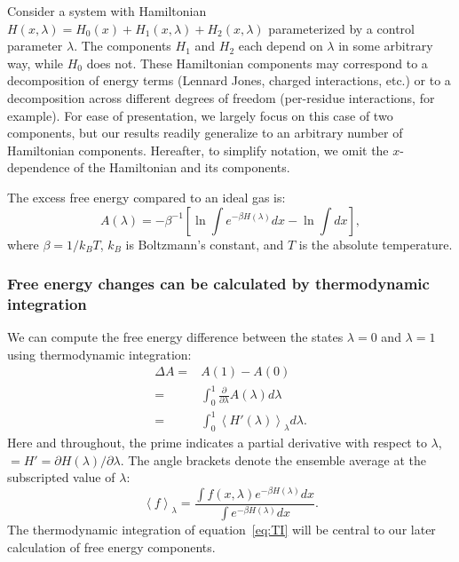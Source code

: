 \documentclass{article}
\begin{document}
Consider a system with Hamiltonian $H(x, \lambda) = H_0 (x) + H_1(x, \lambda) + H_2(x, \lambda)$ parameterized by a control parameter $\lambda$. The components $H_1$ and  $H_2$ each depend on $\lambda$ in some arbitrary way, while $H_0$ does not.  These Hamiltonian components may correspond to a decomposition of energy terms (Lennard Jones, charged interactions, etc.) or to a decomposition across different degrees of freedom (per-residue interactions, for example). For ease of presentation, we largely focus on this case of two components, but our results readily generalize to an arbitrary number of Hamiltonian components. Hereafter, to simplify notation, we omit the $x$-dependence of the Hamiltonian and its components.

The excess free energy compared to an ideal gas is:
\begin{equation}\label{eq:dA}
A(\lambda) = -\beta^{-1} \left[ 
	\ln \int e^{-\beta H(\lambda)} dx - 
	\ln \int dx
\right],
\end{equation}
where $\beta=1/k_BT$, $k_B$ is Boltzmann's constant, and $T$ is the absolute temperature.

\subsubsection{Free energy changes can be calculated by thermodynamic integration}

We can compute the free energy difference between the states $\lambda=0$ and $\lambda=1$ using thermodynamic integration:
\begin{align}
\Delta A =&  A(1) - A(0) \nonumber\\
               =& \int_0^1 \frac{\partial }{\partial \lambda}  A(\lambda) d \lambda \nonumber\\
               =& \int_0^1 \left\langle H'(\lambda)\right\rangle_\lambda 
                d\lambda \label{eq:TI}. 
\end{align}
Here and throughout, the prime indicates a partial derivative with respect to $\lambda$, $ = H' = \partial H(\lambda) / \partial \lambda$. 
The angle brackets denote the ensemble average at the subscripted value of $\lambda$:
\begin{equation}
\left\langle f \right\rangle_\lambda = \frac
	{\int f(x, \lambda) e^{-\beta H(\lambda)} dx}
    {\int e^{-\beta H(\lambda)} dx}.
\end{equation}
The thermodynamic integration of equation~\ref{eq:TI} will be central to our later calculation of free energy components. 
\end{document}
